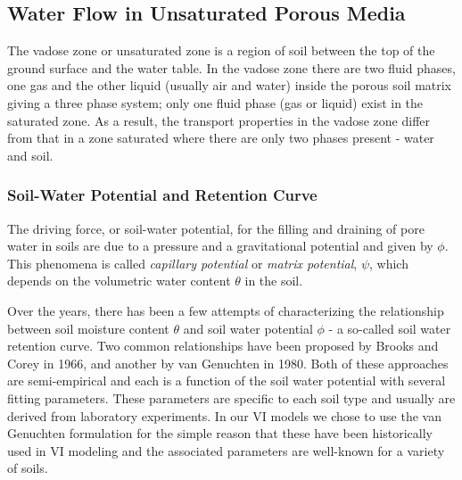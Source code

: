 
\subsection{Water Flow in Unsaturated Porous Media}\label{sec:richards}

The vadose zone or unsaturated zone is a region of soil between the top of the ground surface and the water table.
In the vadose zone there are two fluid phases, one gas and the other liquid (usually air and water) inside the porous soil matrix giving a three phase system; only one fluid phase (gas or liquid) exist in the saturated zone.
As a result, the transport properties in the vadose zone differ from that in a zone saturated where there are only two phases present - water and soil.\par

\subsubsection{Soil-Water Potential and Retention Curve}

The driving force, or soil-water potential, for the filling and draining of pore water in soils are due to a pressure and a gravitational potential and given by $\phi$.
This phenomena is called \textit{capillary potential} or \textit{matrix potential}, $\psi$, which depends on the volumetric water content $\theta$ in the soil.\par

Over the years, there has been a few attempts of characterizing the relationship between soil moisture content $\theta$ and soil water potential $\phi$ - a so-called soil water retention curve.
Two common relationships have been proposed by Brooks and Corey in 1966\cite{brooks_properties_1966}, and another by van Genuchten in 1980\cite{van_genuchten_closed-form_1980}.
Both of these approaches are semi-empirical and each is a function of the soil water potential with several fitting parameters.
These parameters are specific to each soil type and usually are derived from laboratory experiments.
In our VI models we chose to use the van Genuchten formulation for the simple reason that these have been historically used in VI modeling and the associated parameters are well-known for a variety of soils.\par

